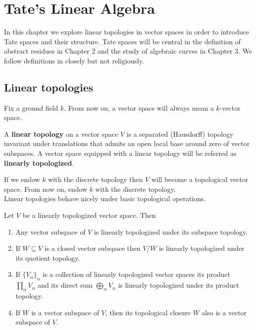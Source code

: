 \chapter{Tate's Linear Algebra}\label{ch:tate-linear-algebra}
In this chapter we explore linear topologies in vector spaces in order to introduce Tate spaces and their structure. Tate spaces will be central in the definition of abstract residues in Chapter 2 and the study of algebraic curves in Chapter 3. We follow definitions in \cite{Chiral} closely but not religiously.
\section{Linear topologies}
Fix a ground field $k$. From now on, a vector space will always mean a $k$-vector space.
\begin{definition}\label{def:linear_topology}
A \textbf{linear topology} on a vector space $V$ is a separated (Hausdorff) topology invariant under translations that admits an open local base around zero of vector subspaces. A vector space equipped with a linear topology will be referred as \textbf{linearly topologized}.
\end{definition}
If we endow $k$ with the discrete topology then $V$ will become a topological vector space. From now on, endow $k$ with the discrete topology. \\
Linear topologies behave nicely under basic topological operations.
\begin{proposition}\label{prop:linear_topologies_properties}
Let $V$ be a linearly topologized vector space. Then
	\begin{enumerate}[label = (\alph*)]
		\item Any vector subspace of $V$ is linearly topologized under its subspace topology.
		\item If $W \subseteq V$ is a closed vector subspace then $V/W$ is linearly topologized under its quotient topology.
		\item If $\{V_{\alpha}\}_{\alpha}$ is a collection of linearly topologized vector spaces its product $\prod_{\alpha} V_{\alpha}$ and its direct sum $\bigoplus_{\alpha} V_{\alpha}$ is linearly topologized under its product topology.
		\item If $W$ is a vector subspace of $V$, then its topological closure $\overline{W}$ also is a vector subspace of $V$.
	\end{enumerate}
\end{proposition}
